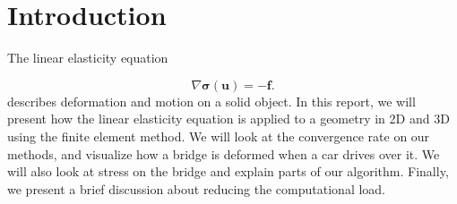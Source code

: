 \section{Introduction}



The linear elasticity equation

\begin{equation}
\label{eq:linEl}
\nabla \bm{\sigma}(\bm{u}) = - \bm{f}.
\end{equation}
describes deformation and motion on a solid object. In this report, we will present how the linear elasticity equation is applied to a geometry in 2D and 3D using the finite element method. We will look at the convergence rate on our methods, and visualize how a bridge is deformed when a car drives over it. We will also look at stress on the bridge and explain parts of our algorithm. Finally, we present a brief discussion about reducing the computational load.